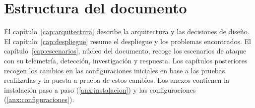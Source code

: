 \section{Estructura del documento}
El capítulo~\ref{cap:arquitectura} describe la arquitectura y las decisiones de
diseño. El capítulo~\ref{cap:despliegue} resume el despliegue y los problemas
encontrados. El capítulo~\ref{cap:escenarios}, núcleo del documento, recoge los
escenarios de ataque con su telemetría, detección, investigación y respuesta. Los capítulos posteriores recogen los cambios en las configuraciones iniciales en base a las pruebas realilzadas y la puesta a prueba de estos cambios. Los
anexos contienen la instalación paso a paso (\ref{anx:instalacion}) y
las configuraciones (\ref{anx:configuraciones}).
